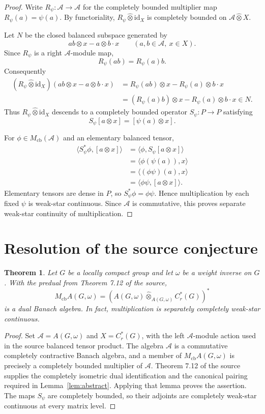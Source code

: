 \documentclass[11pt]{article}
\newtheorem{theorem}{Theorem}
\newcommand{\A}{\mathcal A}
\newcommand{\Mcb}{M_{\mathrm{cb}}}
\begin{document}
\begin{proof}
Write $R_\psi:\A\to\A$ for the completely bounded multiplier map
$R_\psi(a)=\psi(a)$.  By functoriality,
$R_\psi\widehat\otimes\mathrm{id}_X$ is completely bounded on
$\A\widehat\otimes X$.

Let $N$ be the closed balanced subspace generated by
\[
 ab\otimes x-a\otimes b\cdot x
 \qquad(a,b\in\A,\ x\in X).
\]
Since $R_\psi$ is a right $\A$-module map,
\[
 R_\psi(ab)=R_\psi(a)b.
\]
Consequently
\begin{align*}
 (R_\psi\widehat\otimes\mathrm{id}_X)
 (ab\otimes x-a\otimes b\cdot x)
 &=R_\psi(ab)\otimes x-R_\psi(a)\otimes b\cdot x\\
 &=(R_\psi(a)b)\otimes x-R_\psi(a)\otimes b\cdot x
 \in N.
\end{align*}
Thus $R_\psi\widehat\otimes\mathrm{id}_X$ descends to a completely bounded
operator $S_\psi:P\to P$ satisfying
\[
 S_\psi[a\otimes x]=[\psi(a)\otimes x].
\]

For $\phi\in\Mcb(\A)$ and an elementary balanced tensor,
\begin{align*}
 \langle S_\psi^*\phi,[a\otimes x]\rangle
 &=\langle\phi,S_\psi[a\otimes x]\rangle\\
 &=\langle\phi(\psi(a)),x\rangle\\
 &=\langle(\phi\psi)(a),x\rangle\\
 &=\langle\phi\psi,[a\otimes x]\rangle.
\end{align*}
Elementary tensors are dense in $P$, so $S_\psi^*\phi=\phi\psi$.  Hence
multiplication by each fixed $\psi$ is weak-star continuous.  Since $\A$ is
commutative, this proves separate weak-star continuity of multiplication.
\end{proof}

\section{Resolution of the source conjecture}

\begin{theorem}\label{thm:main}
Let $G$ be a locally compact group and let $\omega$ be a weight inverse on
$G$.  With the predual from Theorem 7.12 of the source,
\[
 \Mcb A(G,\omega)
 =\left(A(G,\omega)
 \widehat\otimes_{A(G,\omega)}C_r^*(G)\right)^*
\]
is a dual Banach algebra.  In fact, multiplication is separately completely
weak-star continuous.
\end{theorem}

\begin{proof}
Set $\A=A(G,\omega)$ and $X=C_r^*(G)$, with the left $\A$-module action
used in the source balanced tensor product.  The algebra $\A$ is a
commutative completely contractive Banach algebra, and a member of
$\Mcb A(G,\omega)$ is precisely a completely bounded multiplier of $\A$.
Theorem 7.12 of the source supplies the completely isometric dual
identification and the canonical pairing required in
Lemma~\ref{lem:abstract}.  Applying that lemma proves the assertion.  The
maps $S_\psi$ are completely bounded, so their adjoints are completely
weak-star continuous at every matrix level.
\end{proof}
\end{document}
